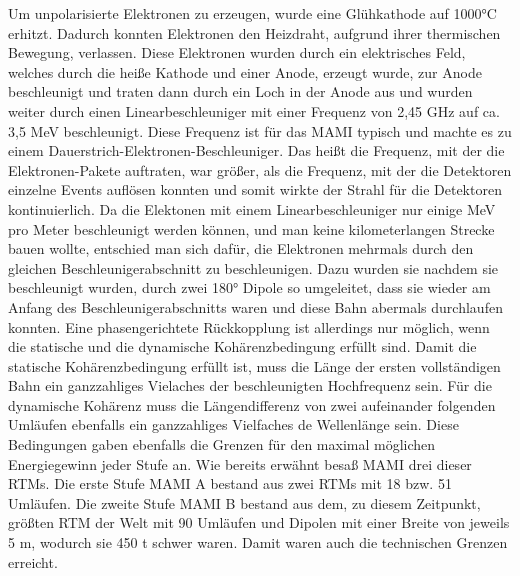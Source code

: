 \documentclass[a4paper,11pt,oneside,final,german,openbib,pdftex]{scrbook}
\begin{document}
Um unpolarisierte Elektronen zu erzeugen, wurde eine Glühkathode auf 1000°C erhitzt. Dadurch konnten Elektronen den Heizdraht, aufgrund ihrer thermischen Bewegung, verlassen. Diese Elektronen wurden durch ein elektrisches Feld, welches durch die heiße Kathode und einer Anode, erzeugt wurde, zur Anode beschleunigt und traten dann durch ein Loch in der Anode aus und wurden weiter durch einen Linearbeschleuniger mit einer Frequenz von 2,45 GHz auf ca. 3,5 MeV beschleunigt. \cite{Un08} Diese Frequenz ist für das MAMI typisch und machte es zu einem Dauerstrich-Elektronen-Beschleuniger. Das heißt die Frequenz, mit der die Elektronen-Pakete auftraten, war größer, als die Frequenz, mit der die Detektoren einzelne Events auflösen konnten und somit wirkte der Strahl für die Detektoren kontinuierlich.
\newline
Da die Elektonen mit einem Linearbeschleuniger nur einige MeV pro Meter beschleunigt werden k\"onnen, und man keine kilometerlangen Strecke bauen wollte, entschied man sich daf\"ur, die Elektronen mehrmals durch den gleichen Beschleunigerabschnitt zu beschleunigen. Dazu wurden sie nachdem sie beschleunigt wurden, durch zwei 180° Dipole so umgeleitet, dass sie wieder am Anfang des Beschleunigerabschnitts waren und diese Bahn abermals durchlaufen konnten. Eine phasengerichtete R\"uckkopplung ist allerdings nur m\"oglich, wenn die statische und die dynamische Koh\"arenzbedingung erf\"ullt sind. Damit die statische Koh\"arenzbedingung erf\"ullt ist, muss die L\"ange der ersten vollst\"andigen Bahn ein ganzzahliges Vielaches der beschleunigten Hochfrequenz sein. F\"ur die dynamische Koh\"arenz muss die L\"angendifferenz von zwei aufeinander folgenden Uml\"aufen ebenfalls ein ganzzahliges Vielfaches de Wellenl\"ange sein\cite{Un08}. Diese Bedingungen gaben ebenfalls die Grenzen f\"ur den maximal m\"oglichen Energiegewinn jeder Stufe an. 
\newline
\newline
Wie bereits erw\"ahnt besa{\ss} MAMI drei dieser RTMs. Die erste Stufe MAMI A bestand aus zwei RTMs mit 18 bzw. 51 Uml\"aufen. Die zweite Stufe MAMI B bestand aus dem, zu diesem Zeitpunkt, gr\"o{\ss}ten RTM der Welt mit 90 Uml\"aufen und Dipolen mit einer Breite von jeweils 5 m, wodurch sie 450 t schwer waren. Damit waren auch die technischen Grenzen erreicht.\cite{KPh11F}
\end{document}
